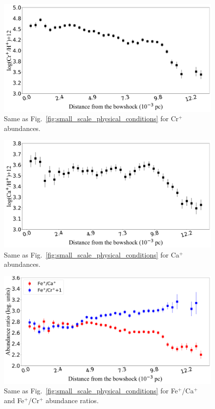 \documentclass[twocolumn,linenumbers]{aastex63}
\begin{document}
\begin{figure}
\centering
\includegraphics[width=\columnwidth]{Cr2_distribution.pdf}
\caption{Same as Fig.~\ref{fig:small_scale_physical_conditions} for Cr$^{+}$ abundances.}
\label{fig:Cr2_abundances}
\end{figure}

\begin{figure}
\centering
\includegraphics[width=\columnwidth]{Ca2_distribution.pdf}
\caption{Same as Fig.~\ref{fig:small_scale_physical_conditions} for Ca$^{+}$ abundances.}
\label{fig:Ca2_abundances}
\end{figure}


\begin{figure}
\centering
\includegraphics[width=\columnwidth]{Ca_Cr_Fe_ionic_ratios_distribution.pdf}
\caption{Same as Fig.~\ref{fig:small_scale_physical_conditions} for Fe$^{+}$/Ca$^{+}$ and Fe$^{+}$/Cr$^{+}$ abundance ratios.}
\label{fig:Ca_Cr_Fe_abundance_ratios}
\end{figure}
\end{document}
